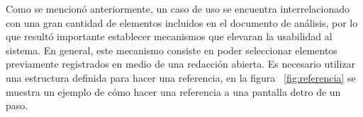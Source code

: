 	Como se mencionó anteriormente, un caso de uso se encuentra interrelacionado con una gran cantidad de elementos incluidos en el documento de análisis, por lo que resultó importante establecer mecanismos que elevaran la usabilidad al sistema. En general, este mecanismo consiste en poder seleccionar elementos previamente registrados en medio de una redacción abierta. Es necesario utilizar una estructura definida para hacer una referencia, en la figura ~\ref{fig:referencia} se muestra un ejemplo de cómo hacer una referencia a una pantalla detro de un paso.
	

	 